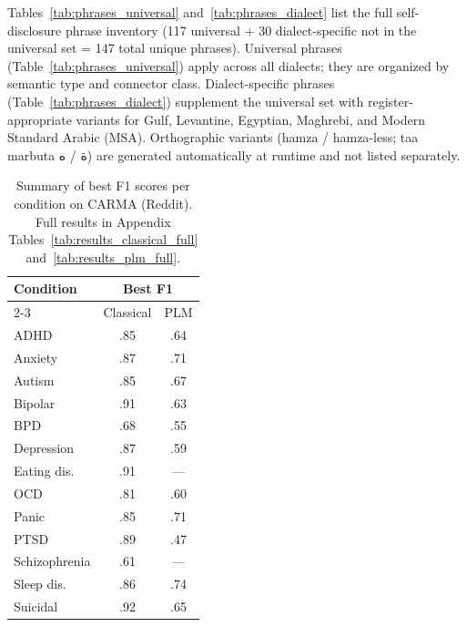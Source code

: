 \documentclass[11pt]{article}
\begin{document}
Tables~\ref{tab:phrases_universal} and~\ref{tab:phrases_dialect} list
the full self-disclosure phrase inventory (117 universal + 30 dialect-specific not in the universal set = 147 total unique phrases). Universal phrases
(Table~\ref{tab:phrases_universal}) apply across all dialects; they are
organized by semantic type and connector class. Dialect-specific phrases
(Table~\ref{tab:phrases_dialect}) supplement the universal set with
register-appropriate variants for Gulf, Levantine, Egyptian, Maghrebi,
and Modern Standard Arabic (MSA). Orthographic variants (hamza /
hamza-less; taa marbuta \foreignlanguage{arabic}{ة} /
\foreignlanguage{arabic}{ه}) are generated automatically at runtime and
not listed separately.

\begin{table}[t]
\nolinenumbers
\centering
\small
\begin{tabular}{lcc}
\toprule
\multirow{2}{*}{Condition} & \multicolumn{2}{c}{Best F1} \\
\cmidrule(lr){2-3}
 & Classical & PLM \\
\midrule
ADHD & .85 & .64 \\
Anxiety & .87 & .71 \\
Autism & .85 & .67 \\
Bipolar & .91 & .63 \\
BPD & .68 & .55 \\
Depression & .87 & .59 \\
Eating dis. & .91 & --- \\
OCD & .81 & .60 \\
Panic & .85 & .71 \\
PTSD & .89 & .47 \\
Schizophrenia & .61 & --- \\
Sleep dis. & .86 & .74 \\
Suicidal & .92 & .65 \\
\bottomrule
\end{tabular}
\caption{Summary of best F1 scores per condition on CARMA (Reddit). Full results in Appendix Tables~\ref{tab:results_classical_full} and~\ref{tab:results_plm_full}.}
\label{tab:results_summary}
\end{table}
\linenumbers
\end{document}
